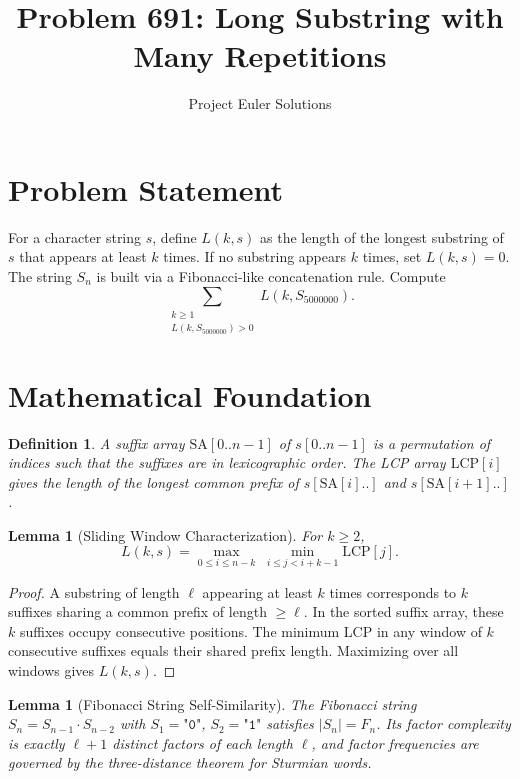 \documentclass[11pt]{article}
\title{Problem 691: Long Substring with Many Repetitions}
\author{Project Euler Solutions}
\date{}
\newtheorem{lemma}[theorem]{Lemma}
\newtheorem{definition}[theorem]{Definition}
\begin{document}
\maketitle

\section{Problem Statement}

For a character string $s$, define $L(k, s)$ as the length of the longest substring of $s$ that appears at least $k$ times. If no substring appears $k$ times, set $L(k, s) = 0$. The string $S_n$ is built via a Fibonacci-like concatenation rule. Compute
\[
\sum_{\substack{k \geq 1 \\ L(k, S_{5000000}) > 0}} L(k, S_{5000000}).
\]

\section{Mathematical Foundation}

\begin{definition}
A \emph{suffix array} $\mathrm{SA}[0..n-1]$ of $s[0..n-1]$ is a permutation of indices such that the suffixes are in lexicographic order. The \emph{LCP array} $\mathrm{LCP}[i]$ gives the length of the longest common prefix of $s[\mathrm{SA}[i]..]$ and $s[\mathrm{SA}[i+1]..]$.
\end{definition}

\begin{lemma}[Sliding Window Characterization]
For $k \geq 2$,
\[
L(k, s) = \max_{0 \leq i \leq n-k} \;\min_{i \leq j < i+k-1} \mathrm{LCP}[j].
\]
\end{lemma}

\begin{proof}
A substring of length $\ell$ appearing at least $k$ times corresponds to $k$ suffixes sharing a common prefix of length $\geq \ell$. In the sorted suffix array, these $k$ suffixes occupy consecutive positions. The minimum LCP in any window of $k$ consecutive suffixes equals their shared prefix length. Maximizing over all windows gives $L(k,s)$.
\end{proof}

\begin{lemma}[Fibonacci String Self-Similarity]
The Fibonacci string $S_n = S_{n-1} \cdot S_{n-2}$ with $S_1 = \texttt{"0"}$, $S_2 = \texttt{"1"}$ satisfies $|S_n| = F_n$. Its factor complexity is exactly $\ell + 1$ distinct factors of each length $\ell$, and factor frequencies are governed by the three-distance theorem for Sturmian words.
\end{lemma}
\end{document}
